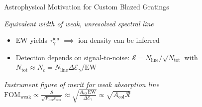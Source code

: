 \documentclass[aspectratio=169,9pt]{beamer}
\begin{document}
\begin{frame}{Astrophysical Motivation for Custom Blazed Gratings}
\begin{minipage}[t]{0.55\linewidth}
\begin{block}{\footnotesize \emph{Equivalent width of weak, unresolved spectral line}}
  \end{block}
  \vspace{-2mm}
 \begin{itemize}
  \item $\text{EW}$ yields $\tau^{\text{ion}}_{\gamma}$ $\implies$ ion density can be inferred%
  \item Detection depends on signal-to-noise: $\mathcal{S} = N_{\text{line}} / \sqrt{N_{\text{tot}}}$ with $N_{\text{tot}} \approx N_c = N_{\text{line}} \Delta \mathcal{E}_{\gamma} / \text{EW}$ %
 \end{itemize}
  \vspace{-2mm}
   \begin{block}{\footnotesize \emph{Instrument figure of merit for weak absorption line}}
   \centering
    $\text{FOM}_{\text{weak}} \propto \frac{\mathcal{S}}{\sqrt{F_{\text{line}}t_{\text{obs}}}} \approx \sqrt{\frac{A_{\text{col}} \text{EW}}{\Delta \mathcal{E}_{\gamma}}} \propto \sqrt{A_{\text{col}} \mathscr{R}}$ 
  \end{block}
  \vspace{-1mm}
 \end{minipage}
\end{frame}
\end{document}
